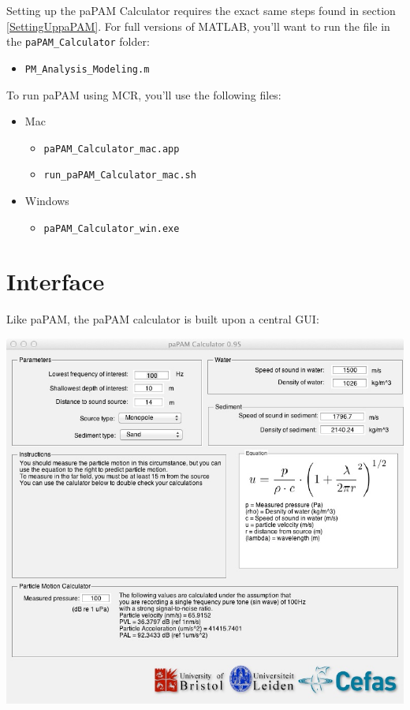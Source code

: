 \documentclass[11pt]{report}
\begin{document}
Setting up the paPAM Calculator requires the exact same steps found in section \ref{SettingUppaPAM}.  For full versions of MATLAB, you'll want to run the file in the \texttt{paPAM\_Calculator} folder:

\begin{itemize}
\item \texttt{PM\_Analysis\_Modeling.m}
\end{itemize}

To run paPAM using MCR, you'll use the following files:

\begin{itemize}
\item Mac
\begin{itemize}
\item \texttt{paPAM\_Calculator\_mac.app}
\item \texttt{run\_paPAM\_Calculator\_mac.sh}
\end{itemize}
\item Windows
\begin{itemize}
\item \texttt{paPAM\_Calculator\_win.exe}
\end{itemize}
\end{itemize}


\section{Interface}
Like paPAM, the paPAM calculator is built upon a central GUI:

\begin{center}
\includegraphics[width = \textwidth ]{13.jpg}
\end{center}
\end{document}
